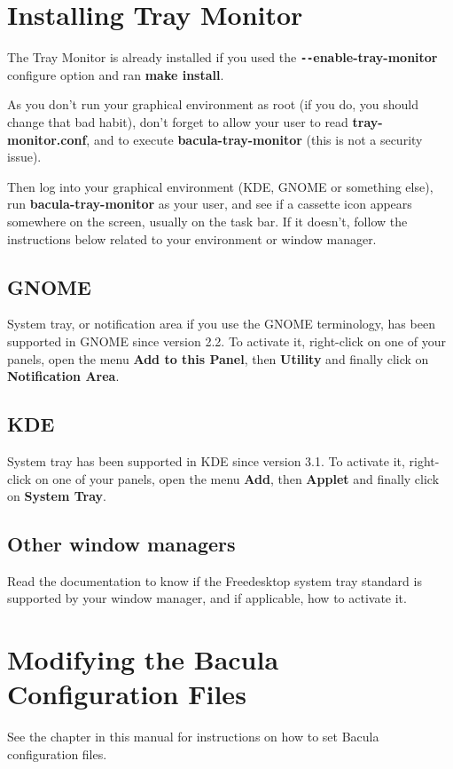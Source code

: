 \label{monitor}

\section{Installing Tray Monitor}

The Tray Monitor is already installed if you used the {\bf
\verb:--:enable-tray-monitor} configure option and ran {\bf make install}.

As you don't run your graphical environment as root (if you do, you should
change that bad habit), don't forget to allow your user to read {\bf
tray-monitor.conf}, and to execute {\bf bacula-tray-monitor} (this is not a
security issue).

Then log into your graphical environment (KDE, GNOME or something else), run
{\bf bacula-tray-monitor} as your user, and see if a cassette icon appears
somewhere on the screen, usually on the task bar.
If it doesn't, follow the instructions below related to your environment or
window manager. 

\subsection{GNOME}

System tray, or notification area if you use the GNOME terminology, has been
supported in GNOME since version 2.2. To activate it, right-click on one of
your panels, open the menu {\bf Add to this Panel}, then {\bf Utility} and
finally click on {\bf Notification Area}. 

\subsection{KDE}

System tray has been supported in KDE since version 3.1. To activate it,
right-click on one of your panels, open the menu {\bf Add}, then {\bf Applet}
and finally click on {\bf System Tray}. 

\subsection{Other window managers}

Read the documentation to know if the Freedesktop system tray standard is
supported by your window manager, and if applicable, how to activate it. 

\section{Modifying the Bacula Configuration Files}

See the chapter 
 in this manual for
instructions on how to set Bacula configuration files. 
